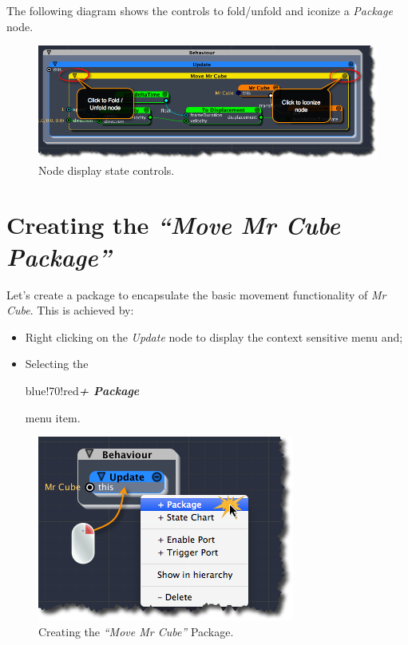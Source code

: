 The following diagram shows the controls to fold\slash unfold and iconize a \emph{Package} node.

\begin{figure}[htbp]
\centering
\includegraphics[keepaspectratio,width=\textwidth,height=0.75\textheight]{node-display-state-controls.png}
\caption{Node display state controls.}
\label{node-display-state-controls.png}
\end{figure}

\section{Creating the \emph{``Move Mr Cube Package''}}
\label{creatingthemovemrcubepackage}

Let's create a package to encapsulate the basic movement functionality of \emph{Mr Cube}. This is achieved by:

\begin{itemize}
\item Right clicking on the \emph{Update} node to display the context sensitive menu and;

\item Selecting the \begin{color}{blue!70!red}\emph{\textbf{+ Package}}\end{color} menu item.

\end{itemize}

\begin{figure}[htbp]
\centering
\includegraphics[keepaspectratio,width=\textwidth,height=0.75\textheight]{creating-package-in-update.png}
\caption{Creating the \emph{``Move Mr Cube''} Package.}
\label{creating-package-in-update.png}
\end{figure}

